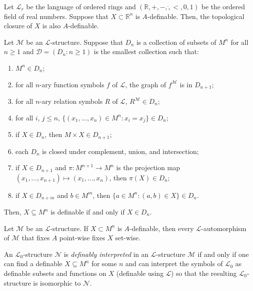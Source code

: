 \documentclass[
	fontsize=10pt, %
]{kaohandt}
\begin{document}
\begin{lemma}
    Let $\mathcal{L}_r$ be the language of ordered rings and 
    $(\mathbb{R}, +, -, \dot, <, 0, 1)$ be the ordered field of real numbers.
    Suppose that $X \subset \mathbb{R}^n$ is $A$-definable.
    Then, the topological closure of $X$ is also $A$-definable.
\end{lemma}

\begin{proposition}
    Let $\mathcal{M}$ be an $\mathcal{L}$-structure.
    Suppose that $D_n$ is a collection of subsets of $M^n$ for all $n \ge 1$ and 
    $\mathcal{D} = (D_n : n \ge 1)$ is the smallest collection such that:
    \begin{enumerate}[label = {\roman*)}]
        \item $M^n \in D_n$;
        \item for all $n$-ary function symbols $f$ of $\mathcal{L}$, the graph of $f^{\mathcal{M}}$ is in $D_{n+1}$;
        \item for all $n$-ary relation symbols $R$ of $\mathcal{L}$, $R^{\mathcal{M}} \in D_n$;
        \item for all $i$, $j\le n$, $\{(x_1,\dots,x_n)\in M^n : x_i = x_j\} \in D_n$;
        \item if $X \in D_n$, then $M \times X \in D_{n+1}$;
        \item each $D_n$ is closed under complement, union, and intersection;
        \item if $X \in D_{n+1}$ and $\pi: M^{n+1} \to M^n$ is the projection map $(x_1,\dots,x_{n+1}) \mapsto (x_1,\dots,x_n)$, then $\pi(X) \in D_n$;
        \item if $X \in D_{n+m}$ and $b \in M^m$, then $\{a\in M^n: (a,b) \in X \} \in D_n$.
    \end{enumerate}
    Then, $X \subseteq M^n$ is definable if and only if $X \in D_n$.
\end{proposition}

\begin{proposition}
    Let $\mathcal{M}$ be an $\mathcal{L}$-structure.
    If $X \subset M^n$ is $A$-definable,
    then every $\mathcal{L}$-automorphism of $\mathcal{M}$ that fixes $A$ point-wise fixes $X$ set-wise.
\end{proposition}

An $\mathcal{L}_0$-structure $\mathcal{N}$ is \emph{definably interpreted} in an $\mathcal{L}$-structure $\mathcal{M}$ 
if and only if one can find a definable $X \subseteq M^n$ for some $n$ and can interpret the symbols of $\mathcal{L}_0$ as definable subsets and functions on $X$ (definable using $\mathcal{L}$) so that the resulting $\mathcal{L}_0$-structure is isomorphic to $\mathcal{N}$.
\end{document}
